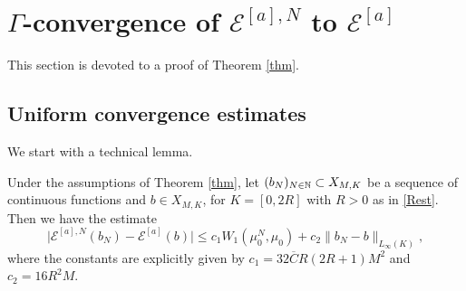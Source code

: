 

\section{$\Gamma$-convergence of $ \mathcal E^{[a],N} $ to $ \mathcal E^{[a]} $}




This section is devoted to a proof of Theorem \ref{thm}.

\subsection{Uniform convergence estimates}

We start with a technical lemma.

\begin{lemma}\label{lemma-semicontinuous-0}
	Under the assumptions of Theorem \ref{thm}, let $(b_N)_{N \in \mathbb{N}}\subset X_{M,K}$ be a sequence of continuous functions and $b \in X_{M,K}$, for $K=[0,2R]$  with $R>0$ as in \eqref{Rest}.
	Then we have the estimate
\begin{equation}\label{approxestimate}	
\bigl|\mathcal E^{[a],N}(b_N)-\mathcal E^{[a]}(b)\bigr|
		\leq  c_1 W_1(\mu_0^N,\mu_0)+ c_2 \| b_{N}-b\|_{L_\infty(K)},
\end{equation}
where the constants are explicitly given by $c_1= 32 \overline{C}R(2R+1)M^2$ and $c_2 = 16R^2M$.
\end{lemma}

